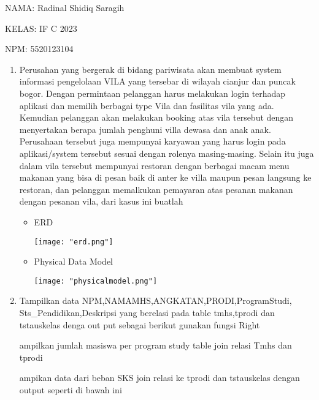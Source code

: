 \documentclass[10pt,a4paper]{article}
\date{}
\newcommand{\codeListing}[3] {
  
}
\begin{document}
  NAMA: Radinal Shidiq Saragih

  KELAS: IF C 2023

  NPM: 5520123104

  \begin{enumerate}
    \item Perusahan yang bergerak di bidang pariwisata akan membuat system
          informasi pengelolaan VILA yang tersebar di wilayah cianjur dan puncak
          bogor. Dengan permintaan pelanggan harus melakukan login terhadap aplikasi
          dan memilih berbagai type Vila dan fasilitas vila yang ada. Kemudian
          pelanggan akan melakukan booking atas vila tersebut dengan menyertakan
          berapa jumlah penghuni villa dewasa dan anak anak. Perusahaan tersebut
          juga mempunyai karyawan yang harus login pada aplikasi/system tersebut
          sesuai dengan rolenya masing-masing. Selain itu juga dalam vila tersebut
          mempunyai restoran dengan berbagai macam menu makanan yang bisa di pesan
          baik di anter ke villa maupun pesan langsung ke restoran, dan pelanggan
          memalkukan pemayaran atas pesanan makanan dengan pesanan vila, dari kasus
          ini buatlah

      \begin{itemize}

        \item ERD

          \texttt{[image: "erd.png"]}

        \item Physical Data Model

          \texttt{[image: "physicalmodel.png"]}

      \end{itemize}

    \newpage

    \item Tampilkan data NPM,NAMAMHS,ANGKATAN,PRODI,ProgramStudi,
          Sts\_Pendidikan,Deskripsi yang berelasi pada table tmhs,tprodi dan
          tstauskelas denga out put sebagai berikut gunakan fungsi Right


          \codeListing{1}


    \item Tampilkan jumlah masiswa per program study table join relasi Tmhs
          dan tprodi


          \codeListing{2}


    \item Tampikan data dari beban SKS join relasi ke tprodi dan tstauskelas
          dengan output seperti di bawah ini



\end{enumerate}
\end{document}
